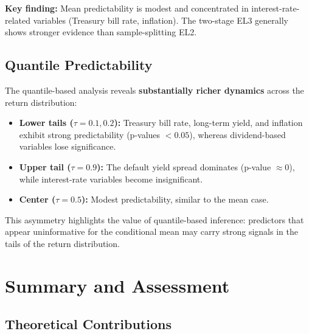 \documentclass[11pt,a4paper]{article}
\theoremstyle{definition}
\theoremstyle{remark}
\begin{document}
\noindent\textbf{Key finding:} Mean predictability is modest and concentrated in
interest-rate-related variables (Treasury bill rate, inflation).
The two-stage EL3 generally shows stronger evidence than sample-splitting EL2.

\subsection{Quantile Predictability}

The quantile-based analysis reveals \textbf{substantially richer dynamics} across
the return distribution:

\begin{itemize}
    \item \textbf{Lower tails ($\tau = 0.1, 0.2$):}
    Treasury bill rate, long-term yield, and inflation exhibit strong predictability
    (p-values $< 0.05$), whereas dividend-based variables lose significance.

    \item \textbf{Upper tail ($\tau = 0.9$):}
    The default yield spread dominates (p-value $\approx 0$),
    while interest-rate variables become insignificant.

    \item \textbf{Center ($\tau = 0.5$):}
    Modest predictability, similar to the mean case.
\end{itemize}

This asymmetry highlights the value of quantile-based inference:
predictors that appear uninformative for the conditional mean may carry
strong signals in the tails of the return distribution.

\section{Summary and Assessment}

\subsection*{Theoretical Contributions}
\end{document}
